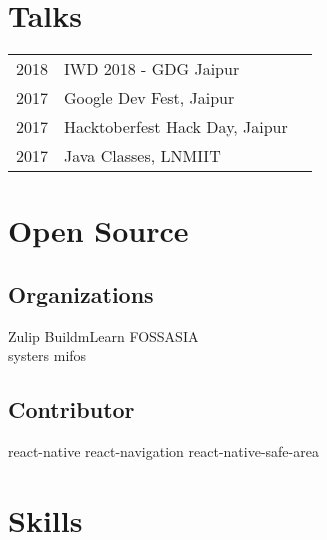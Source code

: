 \documentclass[a4paper]{deedy-resume} %
\begin{document}
\begin{minipage}[t]{0.33\textwidth}
\sectionspace %


\section{Talks}

\begin{tabular}{rll}
2018 & IWD 2018 - GDG Jaipur\\
2017 & Google Dev Fest, Jaipur\\
2017 & Hacktoberfest Hack Day, Jaipur\\
2017 & Java Classes, LNMIIT\\
\end{tabular}

\sectionspace %


\section{Open Source}
\subsection{Organizations}

Zulip \textbullet{} BuildmLearn  \textbullet{} FOSSASIA \\
systers \textbullet{} mifos \\

\sectionspace %

\subsection{Contributor}

\textbullet{} react-native
\textbullet{} react-navigation
\textbullet{} react-native-safe-area

\sectionspace %


\section{Skills}


\end{minipage}
\end{document}

